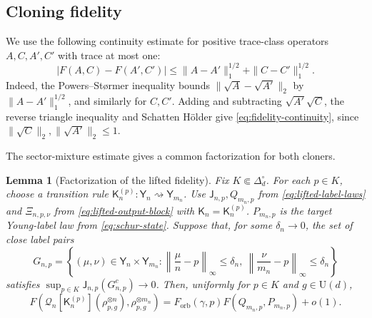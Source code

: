 \documentclass[11pt]{article}
\newtheorem{lemma}[lemma]{Lemma}
\theoremstyle{remark}
\theoremstyle{plain}
\newcommand{\U}{\mathrm U}
\newcommand{\ot}{\otimes}
\newcommand{\Forb}{F_{\mathrm{orb}}}
\begin{document}
\subsection{Cloning fidelity}
\label{sec:achievability-completion}

We use the following continuity estimate for positive trace-class
operators \(A,C,A',C'\) with trace at most one:
\begin{equation}\label{eq:fidelity-continuity}
  |F(A,C)-F(A',C')|
  \le \|A-A'\|_1^{1/2}+\|C-C'\|_1^{1/2}.
\end{equation}
Indeed, the Powers--St\o rmer inequality bounds
\(\|\sqrt A-\sqrt{A'}\|_2\) by \(\|A-A'\|_1^{1/2}\), and similarly for
\(C,C'\).  Adding and subtracting \(\sqrt{A'}\sqrt C\), the reverse triangle
inequality and Schatten H\"older give \eqref{eq:fidelity-continuity}, since
\(\|\sqrt C\|_2,\|\sqrt{A'}\|_2\le1\).

The sector-mixture estimate gives a common factorization for both cloners.

\begin{lemma}[Factorization of the lifted fidelity]
\label{lem:lifted-fidelity-factorization}
Fix \(K\Subset\Delta_d^\circ\).  For each \(p\in K\), choose a transition
rule \(\mathsf K_n^{(p)}:\mathsf Y_n\rightsquigarrow\mathsf Y_{m_n}\).
Use \(\mathsf J_{n,p},Q_{m_n,p}\) from \eqref{eq:lifted-label-laws}
and \(\Xi_{n,p,\nu}\) from \eqref{eq:lifted-output-block} with
\(\mathsf K_n=\mathsf K_n^{(p)}\).
\(P_{m_n,p}\) is the target Young-label law from \eqref{eq:schur-state}.
Suppose that,
for some \(\delta_n\to0\), the set of close label pairs
\[
 G_{n,p}
 =\left\{(\mu,\nu)\in\mathsf Y_n\times\mathsf Y_{m_n}:
   \left\|\frac\mu n-p\right\|_\infty\le\delta_n,\
   \left\|\frac\nu{m_n}-p\right\|_\infty\le\delta_n\right\}
\]
satisfies \(\sup_{p\in K}\mathsf J_{n,p}(G_{n,p}^c)\to0\).
Then, uniformly for \(p\in K\) and \(g\in\U(d)\),
\begin{equation}\label{eq:lifted-fidelity-factorization}
 F\!\left(\mathcal Q_n[\mathsf K_n^{(p)}](\rho_{p,g}^{\ot n}),
                         \rho_{p,g}^{\ot m_n}\right)
 =\Forb(\gamma,p)F(Q_{m_n,p},P_{m_n,p})+o(1).
\end{equation}
\end{lemma}
\end{document}
